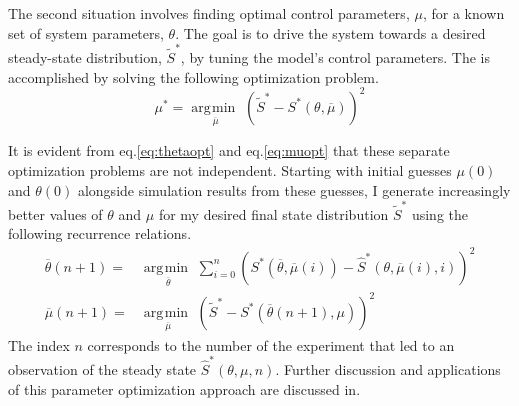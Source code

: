 \documentclass[defaultstyle,12pt]{proposal}
\DeclareMathOperator*{\argmin}{\arg\!\min\>}
\begin{document}
The second situation involves finding optimal control parameters, $\mu$, for a known set of system parameters, $\theta$. The goal is to drive the system towards a desired steady-state distribution, $\tilde{S}^*$, by tuning the model's control parameters. The is accomplished by solving the following optimization problem.
\begin{equation}
	\mu^* = \underset{\overline{\mu}}{\argmin}\left(\tilde{S}^* - S^*(\theta, \overline{\mu})\right)^2 \label{eq:muopt}
\end{equation}

It is evident from eq.\eqref{eq:thetaopt} and eq.\eqref{eq:muopt} that these separate optimization problems are not independent. Starting with initial guesses $\mu(0)$ and $\theta(0)$ alongside simulation results from these guesses, I generate increasingly better values of $\theta$ and $\mu$ for my desired final state distribution $\tilde{S}^*$ using the following recurrence relations.
\begin{align}\label{eq:paramrel}
	\overline{\theta}(n + 1) = & \underset{\overline{\theta}}{\argmin}\sum\limits_{i=0}^{n}\left(S^*(\overline{\theta},\overline{\mu}(i)) - \hat{S}^*(\theta, \overline{\mu}(i), i)\right)^2\\
	\overline{\mu}(n + 1) = & \underset{\overline{\mu}}{\argmin}\left(\tilde{S}^* - S^*(\overline{\theta}(n + 1), \mu)\right)^2
\end{align}
The index $n$ corresponds to the number of the experiment that led to an observation of the steady state $\hat{S}^*(\theta, \mu, n)$. Further discussion and applications of this parameter optimization approach are discussed in\cite{Correll2006a,Correll2008}.
\end{document}
